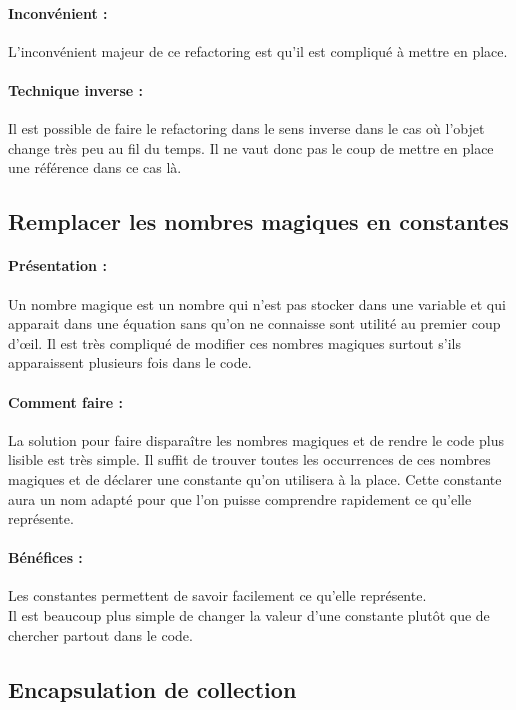 \documentclass[a4paper,twoside,12pt,openright]{report}
\begin{document}
\paragraph{Inconvénient :}
L'inconvénient majeur de ce refactoring est qu'il est compliqué à mettre en place.

\paragraph{Technique inverse :}
Il est possible de faire le refactoring dans le sens inverse dans le cas où l'objet change très peu au fil du temps. Il ne vaut donc pas le coup de mettre en place une référence dans ce cas là.

\subsection{Remplacer les nombres magiques en constantes}
\paragraph{Présentation :}
Un nombre magique est un nombre qui n'est pas stocker dans une variable et qui apparait dans une équation sans qu'on ne connaisse sont utilité au premier coup d'œil. Il est très compliqué de modifier ces nombres magiques surtout s'ils apparaissent plusieurs fois dans le code.

\paragraph{Comment faire :}
La solution pour faire disparaître les nombres magiques et de rendre le code plus lisible est très simple. Il suffit de trouver toutes les occurrences de ces nombres magiques et de déclarer une constante qu'on utilisera à la place. Cette constante aura un nom adapté pour que l'on puisse comprendre rapidement ce qu'elle représente.

\paragraph{Bénéfices :}
Les constantes permettent de savoir facilement ce qu'elle représente.\\
Il est beaucoup plus simple de changer la valeur d'une constante plutôt que de chercher partout dans le code.

\subsection{Encapsulation de collection}
\end{document}
